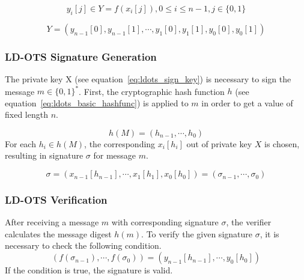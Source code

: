 \begin{equation}
y_i[j] \in Y = f(x_i[j]), 0 \leq i \leq n-1, j \in \lbrace 0,1 \rbrace
\end{equation}

\begin{equation}
Y = \left( 
y_{n-1}\left[0\right], y_{n-1}\left[1 \right], \cdots, y_{1}\left[0\right], y_{1}\left[1\right], y_{0}\left[0\right], y_{0}\left[1\right]
\right)
\end{equation}

\subsubsection{LD-OTS Signature Generation} %
The private key X (see equation~\ref{eq:ldots_sign_key}) is necessary to sign the message $m \in \lbrace 0,1 \rbrace^*$. 
First, the cryptographic hash function $h$ (see equation~\ref{eq:ldots_basic_hashfunc}) is applied to $m$ in order to get a value of fixed length $n$.

\begin{equation}
\label{eq:ldots_hash_message}
h(M)=(h_{n-1}, \cdots, h_{0})
\end{equation}
For each $h_i \in h(M)$, the corresponding $x_i[h_i]$ out of private key $X$ is chosen, resulting in signature $\sigma$ for message $m$.

\begin{equation}
\sigma = \left(
x_{n-1} \left[ h_{n-1} \right], \cdots, x_1\left[ h_1 \right], x_0\left[ h_0\right]
\right) = (\sigma_{n-1}, \cdots, \sigma_0)
\end{equation}

\subsubsection{LD-OTS Verification}
After receiving a message $m$ with corresponding signature $\sigma$, the verifier calculates the message digest $h(m)$. 
To verify the given signature $\sigma$, it is necessary to check the following condition.
\begin{equation}
\left(
f(\sigma_{n-1}), \cdots, f(\sigma_0)
\right) =
\left(
y_{n-1}[h_{n-1}], \cdots, y_0[h_0]
\right)
\end{equation}
If the condition is true, the signature is valid.


